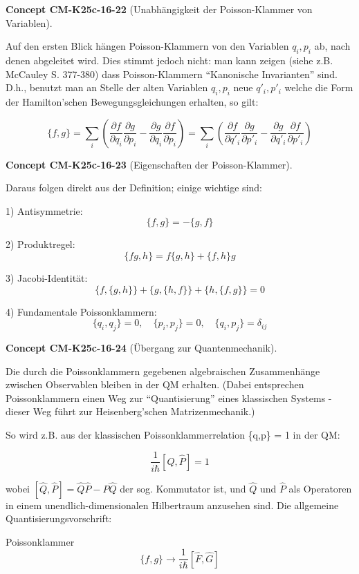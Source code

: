 \documentclass[10pt, letterpaper]{article}
\newcommand{\CustomHeading}[3]{%
  \par\medskip\noindent%
  \textbf{#1 #2} \textnormal{(#3)}.\enskip%
}
\newenvironment{CONC}[2]{\CustomHeading{Concept}{#1}{#2}}{}
\begin{document}
\begin{CONC}{CM-K25c-16-22}{Unabhängigkeit der Poisson-Klammer von Variablen}
Auf den ersten Blick hängen Poisson-Klammern von den Variablen $q_i,p_i$ ab, nach denen abgeleitet wird. Dies stimmt jedoch nicht: man kann zeigen (siehe z.B. McCauley S. 377-380) dass Poisson-Klammern ``Kanonische Invarianten'' sind. D.h., benutzt man an Stelle der alten Variablen $q_i,p_i$ neue $q'_i,p'_i$ welche die Form der Hamilton'schen Bewegungsgleichungen erhalten, so gilt:

\[\{f,g\} = \sum_i \left(\frac{\partial f}{\partial q_i}\frac{\partial g}{\partial p_i} - \frac{\partial g}{\partial q_i}\frac{\partial f}{\partial p_i}\right) = \sum_i \left(\frac{\partial f}{\partial q'_i}\frac{\partial g}{\partial p'_i} - \frac{\partial g}{\partial q'_i}\frac{\partial f}{\partial p'_i}\right)\]
\end{CONC}

\begin{CONC}{CM-K25c-16-23}{Eigenschaften der Poisson-Klammer}
Daraus folgen direkt aus der Definition; einige wichtige sind:

1) Antisymmetrie: 
\[\{f,g\} = -\{g,f\}\]

2) Produktregel:
\[\{fg,h\} = f\{g,h\} + \{f,h\}g\]

3) Jacobi-Identität:
\[\{f,\{g,h\}\} + \{g,\{h,f\}\} + \{h,\{f,g\}\} = 0\]

4) Fundamentale Poissonklammern:
\[\{q_i,q_j\} = 0, \quad \{p_i,p_j\} = 0, \quad \{q_i,p_j\} = \delta_{ij}\]
\end{CONC}

\begin{CONC}{CM-K25c-16-24}{Übergang zur Quantenmechanik}
Die durch die Poissonklammern gegebenen algebraischen Zusammenhänge zwischen Observablen bleiben in der QM erhalten. (Dabei entsprechen Poissonklammern einen Weg zur ``Quantisierung'' eines klassischen Systems - dieser Weg führt zur Heisenberg'schen Matrizenmechanik.)

So wird z.B. aus der klassischen Poissonklammerrelation \{q,p\} = 1 in der QM:

\[\frac{1}{i\hbar}[\hat{Q},\hat{P}] = 1\]

wobei $[\hat{Q},\hat{P}]= \hat{Q}\hat{P}-\hat{P}\hat{Q}$ der sog. Kommutator ist, und $\hat{Q}$ und $\hat{P}$ als Operatoren in einem unendlich-dimensionalen Hilbertraum anzusehen sind. Die allgemeine Quantisierungsvorschrift:

Poissonklammer \[\{f,g\} \rightarrow \frac{1}{i\hbar}[\hat{F},\hat{G}]\]
\end{CONC}
\end{document}

